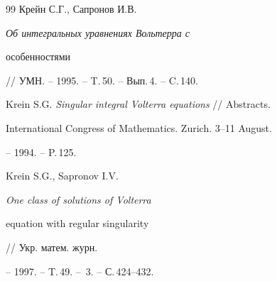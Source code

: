 \begin{thebibliography}{99}
Крейн С.Г., Сапронов И.В. {\em Об интегральных уравнениях Вольтерра с 


особенностями} // УМН. -- 1995. -- T.\,50. -- Вып.\,4. -- C.\,140.




Krein S.G. {\em Singular integral Volterra equations} // Abstracts. 


International Congress of Mathematics. Zurich. 3--11 August.


-- 1994. -- P.\,125.




Krein S.G., Sapronov I.V. {\em One class of solutions of Volterra 


equation with regular singularity} // Укр. матем. журн.


-- 1997. -- T.\,49. -- \No\,3. -- С.\,424--432. 





\end{thebibliography}





\vskip 2cm












\label{end}





